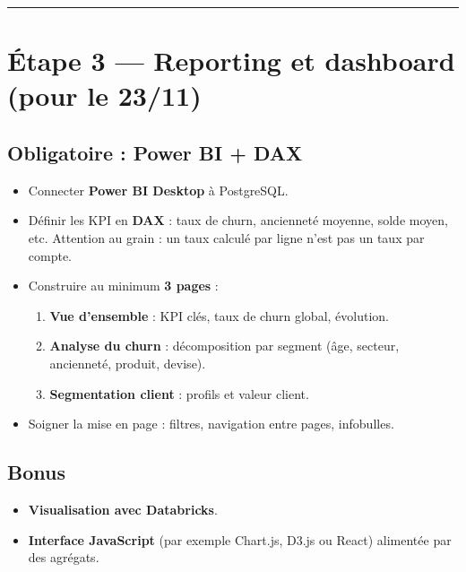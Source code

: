 \documentclass[11pt,a4paper]{article}
\providecommand{\tightlist}{\setlength{\itemsep}{0pt}\setlength{\parskip}{0pt}}
\begin{document}
\begin{center}\rule{0.5\linewidth}{0.5pt}\end{center}

\section{Étape 3 --- Reporting et dashboard (pour le
23/11)}\label{uxe9tape-3-reporting-et-dashboard-pour-le-2311}

\subsection{Obligatoire : Power BI +
DAX}\label{obligatoire-power-bi-dax}

\begin{itemize}
\tightlist
\item
  Connecter \textbf{Power BI Desktop} à PostgreSQL.
\item
  Définir les KPI en \textbf{DAX} : taux de churn, ancienneté moyenne,
  solde moyen, etc. Attention au grain : un taux calculé par ligne n'est
  pas un taux par compte.
\item
  Construire au minimum \textbf{3 pages} :

  \begin{enumerate}
  \def\labelenumi{\arabic{enumi}.}
  \tightlist
  \item
    \textbf{Vue d'ensemble} : KPI clés, taux de churn global, évolution.
  \item
    \textbf{Analyse du churn} : décomposition par segment (âge, secteur,
    ancienneté, produit, devise).
  \item
    \textbf{Segmentation client} : profils et valeur client.
  \end{enumerate}
\item
  Soigner la mise en page : filtres, navigation entre pages, infobulles.
\end{itemize}

\subsection{Bonus}\label{bonus-2}

\begin{itemize}
\tightlist
\item
  \textbf{Visualisation avec Databricks}.
\item
  \textbf{Interface JavaScript} (par exemple Chart.js, D3.js ou React)
  alimentée par des agrégats.
\end{itemize}
\end{document}
